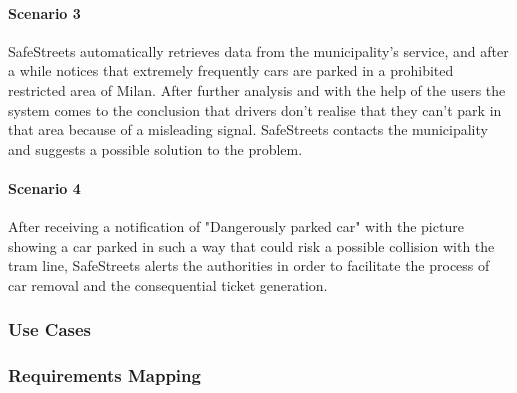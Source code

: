 \paragraph{Scenario 3}
\label{scenario:3}
	SafeStreets automatically retrieves data from the municipality's service, and after a while notices that extremely frequently cars are parked in a prohibited restricted area of Milan. After further analysis and with the help of the users the system comes to the conclusion that drivers don't realise that they can't park in that area because of a misleading signal. SafeStreets  contacts the municipality and suggests a possible solution to the problem.

\paragraph{Scenario 4}
\label{scenario:4}
	After receiving a notification of "Dangerously parked car" with the picture showing a car parked in such a way that could risk a possible collision with the tram line, SafeStreets alerts the authorities in order to facilitate the process of car removal and the consequential ticket generation.
	
\clearpage

\subsubsection{Use Cases}

\clearpage

\subsubsection{Requirements Mapping}

